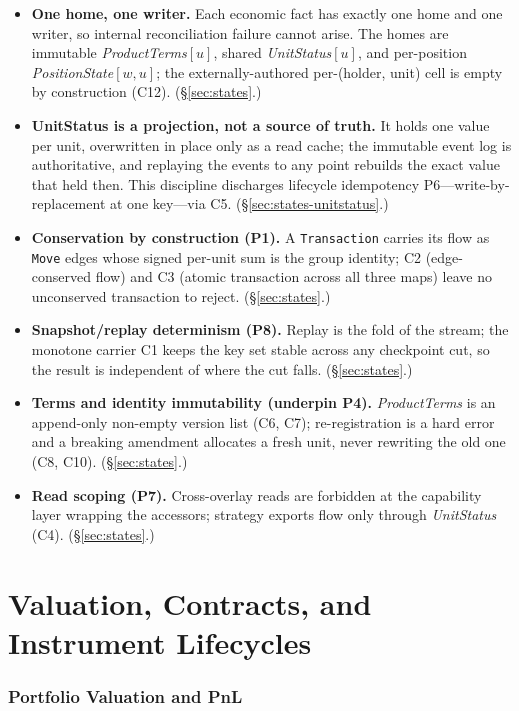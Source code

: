 \documentclass[11pt,a4paper]{article}
\begin{document}
\begin{itemize}[nosep]
\item \textbf{One home, one writer.} Each economic fact has exactly one home and one
writer, so internal reconciliation failure cannot arise. The homes are immutable
\emph{ProductTerms}$[u]$, shared \emph{UnitStatus}$[u]$, and per-position
\emph{PositionState}$[w,u]$; the externally-authored per-(holder, unit) cell is empty by
construction (C12). (\S\ref{sec:states}.)
\item \textbf{UnitStatus is a projection, not a source of truth.} It holds one value per
unit, overwritten in place only as a read cache; the immutable event log is authoritative,
and replaying the events to any point rebuilds the exact value that held then. This
discipline discharges lifecycle idempotency P6---write-by-replacement at one key---via C5.
(\S\ref{sec:states-unitstatus}.)
\item \textbf{Conservation by construction (P1).} A \texttt{Transaction} carries its flow
as \texttt{Move} edges whose signed per-unit sum is the group identity; C2 (edge-conserved
flow) and C3 (atomic transaction across all three maps) leave no unconserved transaction
to reject. (\S\ref{sec:states}.)
\item \textbf{Snapshot/replay determinism (P8).} Replay is the fold of the stream; the
monotone carrier C1 keeps the key set stable across any checkpoint cut, so the result is
independent of where the cut falls. (\S\ref{sec:states}.)
\item \textbf{Terms and identity immutability (underpin P4).} \emph{ProductTerms} is an
append-only non-empty version list (C6, C7); re-registration is a hard error and a breaking
amendment allocates a fresh unit, never rewriting the old one (C8, C10).
(\S\ref{sec:states}.)
\item \textbf{Read scoping (P7).} Cross-overlay reads are forbidden at the capability layer
wrapping the accessors; strategy exports flow only through \emph{UnitStatus} (C4).
(\S\ref{sec:states}.)
\end{itemize}


\part{Valuation, Contracts, and Instrument Lifecycles}
\section{Portfolio Valuation and PnL}
\label{sec:valuation}
\end{document}
